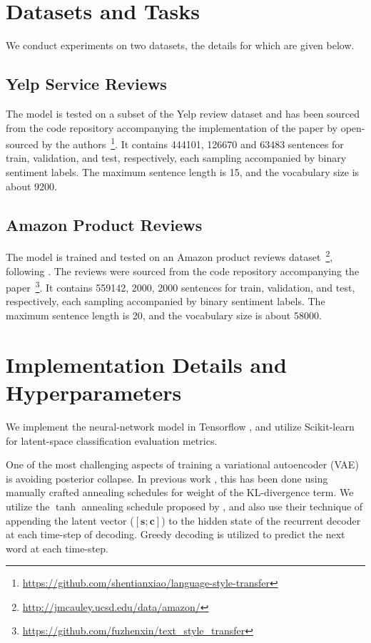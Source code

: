 \section{Datasets and Tasks} \label{sec:datasets-tasks}

We conduct experiments on two datasets, the details for which are given below.

\subsection{Yelp Service Reviews}

The model is tested on a subset of the Yelp review dataset \citep{challenge2013yelp} and has been sourced from the code repository accompanying the implementation of the paper by \cite{shen2017style} open-sourced by the authors~\footnote{\url{https://github.com/shentianxiao/language-style-transfer}}. It contains 444101, 126670 and 63483 sentences for train, validation, and test, respectively, each sampling accompanied by binary sentiment labels. The maximum sentence length is 15, and the vocabulary size is about 9200.

\subsection{Amazon Product Reviews}

The model is trained and tested on an Amazon product reviews dataset~\footnote{\url{http://jmcauley.ucsd.edu/data/amazon/}}, following \cite{fu2017style}. The reviews were sourced from the code repository accompanying the paper~\footnote{\url{https://github.com/fuzhenxin/text_style_transfer}}. It contains 559142, 2000, 2000 sentences for train, validation, and test, respectively, each sampling accompanied by binary sentiment labels. The maximum sentence length is 20, and the vocabulary size is about 58000.


\section{Implementation Details and Hyperparameters}

We implement the neural-network model in Tensorflow \citep{abadi2016tensorflow}, and utilize Scikit-learn \cite{pedregosa2011scikit} for latent-space classification evaluation metrics.

One of the most challenging aspects of training a variational autoencoder (VAE) is avoiding posterior collapse. In previous work \citep{yang2017improved, bowman2016generating, bahuleyan2017variational}, this has been done using manually crafted annealing schedules for weight of the KL-divergence term. We utilize the $\tanh$ annealing schedule proposed by \cite{bahuleyan2017variational}, and also use their technique of appending the latent vector ($[\bm s; \bm c]$) to the hidden state of the recurrent decoder at each time-step of decoding. Greedy decoding is utilized to predict the next word at each time-step.

